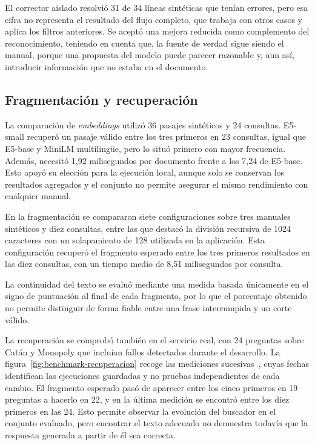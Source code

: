 El corrector aislado resolvió 31 de 34 líneas sintéticas que tenían errores, pero
esa cifra no representa el resultado del flujo completo, que trabaja con
otros casos y aplica los filtros anteriores. Se aceptó una mejora reducida
como complemento del reconocimiento, teniendo en cuenta que, la fuente de verdad sigue siendo el manual,
porque una propuesta del modelo puede parecer razonable y, aun así,
introducir información que no estaba en el documento.

\subsection{Fragmentación y recuperación}

La comparación de \textit{embeddings} utilizó 36 pasajes sintéticos y
24 consultas. E5-small recuperó un pasaje válido entre los tres primeros
en 23 consultas, igual que E5-base y MiniLM multilingüe, pero lo situó
primero con mayor frecuencia. Además, necesitó 1,92 milisegundos por
documento frente a los 7,24 de E5-base. Esto apoyó su elección para la
ejecución local, aunque solo se conservan los resultados agregados y el
conjunto no permite asegurar el mismo rendimiento con cualquier manual.

En la fragmentación se compararon siete configuraciones sobre tres manuales
sintéticos y diez consultas, entre las que destacó la división recursiva de
1024 caracteres con un solapamiento de 128 utilizada en la aplicación.
Esta configuración recuperó el fragmento esperado entre los tres primeros
resultados en las diez consultas, con un tiempo medio de 8,51 milisegundos
por consulta.

La continuidad del texto se evaluó mediante una medida basada únicamente
en el signo de puntuación al final de cada fragmento, por lo que el
porcentaje obtenido no permite distinguir de forma fiable entre una frase
interrumpida y un corte válido.

La recuperación se comprobó también en el servicio real, con 24 preguntas
sobre Catán y Monopoly que incluían fallos detectados durante el desarrollo.
La figura~\ref{fig:benchmark-recuperacion} recoge las mediciones
sucesivas~\cite{manualito_benchmarks}, cuyas fechas identifican las ejecuciones
guardadas y no pruebas independientes de cada cambio.
El fragmento esperado pasó de aparecer entre los cinco primeros en
19 preguntas a hacerlo en 22, y en la última medición se encontró entre
los diez primeros en las 24. Esto permite observar la evolución del buscador
en el conjunto evaluado, pero encontrar el texto adecuado no demuestra
todavía que la respuesta generada a partir de él sea correcta.

